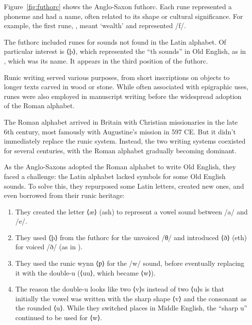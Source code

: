 Figure~\ref{fig:futhorc} shows the Anglo-Saxon futhorc. Each rune represented a phoneme and had a name, often related to its shape or cultural significance. For example, the first rune, , meant `wealth' and represented /f/.

The futhorc included runes for sounds not found in the Latin alphabet. Of particular interest is ⟨þ⟩, which represented the ``th sounds'' in Old English, as in , which was its name. It appears in the third position of the futhorc.

Runic writing served various purposes, from short inscriptions on objects to longer texts carved in wood or stone. While often associated with epigraphic uses, runes were also employed in manuscript writing before the widespread adoption of the Roman alphabet.

The Roman alphabet arrived in Britain with Christian missionaries in the late 6th century, most famously with Augustine's mission in 597 CE. But it didn't immediately replace the runic system. Instead, the two writing systems coexisted for several centuries, with the Roman alphabet gradually becoming dominant.

As the Anglo-Saxons adopted the Roman alphabet to write Old English, they faced a challenge: the Latin alphabet lacked symbols for some Old English sounds. To solve this, they repurposed some Latin letters, created new ones, and even borrowed from their runic heritage:

\begin{enumerate}[noitemsep]
    \item They created the letter ⟨æ⟩ (ash) to represent a vowel sound between /a/ and /e/.

    \item They used ⟨þ⟩ from the futhorc for the unvoiced /θ/ and introduced ⟨ð⟩ (eth) for voiced /ð/ (as in ).

    \item They used the runic wynn ⟨ƿ⟩ for the /w/ sound, before eventually replacing it with the double-u (⟨uu⟩, which became ⟨w⟩).

    \item The reason the double-u looks like two ⟨v⟩s instead of two ⟨u⟩s is that initially the vowel was written with the sharp shape ⟨v⟩ and the consonant as the rounded ⟨u⟩. While they switched places in Middle English, the \enquote{sharp u} continued to be used for ⟨w⟩.
\end{enumerate}

